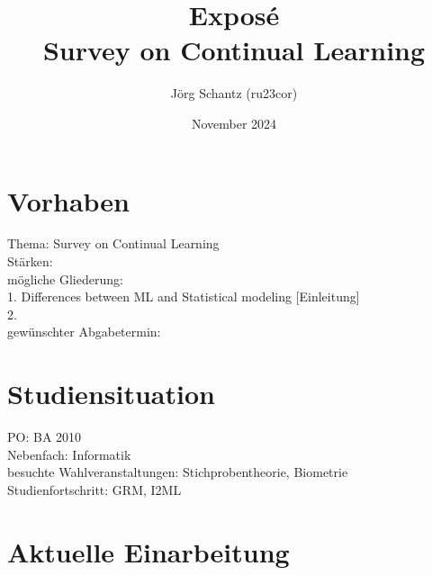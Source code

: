 \documentclass[11pt,a4paper]{report}
\title{Exposé\\
	\Large{Survey on Continual Learning}}
\author{Jörg Schantz (ru23cor)}
\date{November 2024}
\begin{document}
	\maketitle
\chapter*{Vorhaben}
	Thema: Survey on Continual Learning\\
	Stärken: \\
	mögliche Gliederung:\\
	1. Differences between ML and Statistical modeling [Einleitung] \\
	2. \\
	gewünschter Abgabetermin:\\
\chapter*{Studiensituation}
	PO: BA 2010\\
	Nebenfach: Informatik\\
	besuchte Wahlveranstaltungen: Stichprobentheorie, Biometrie\\
	Studienfortschritt: GRM, I2ML\\
\chapter*{Aktuelle Einarbeitung}
	
\end{document}
